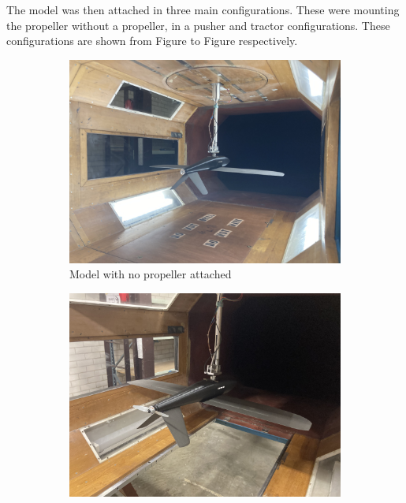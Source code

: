 

The model was then attached in three main configurations. These were mounting the propeller without a propeller, in a pusher and tractor configurations. These configurations are shown from Figure  to Figure  respectively.


\begin{figure}[H]
     \centering
     \begin{subfigure}[b]{0.3\textwidth}
         \centering
         \includegraphics[scale=0.03]{04_Methodology/Figs/noprop}
         \caption{Model with no propeller attached}
          \label{fig:noprop}
     \end{subfigure}
     \hfill
     \begin{subfigure}[b]{0.3\textwidth}
             \centering
             \includegraphics[scale = 0.03]{04_Methodology/Figs/pusher}

\end{subfigure}
\end{figure}
